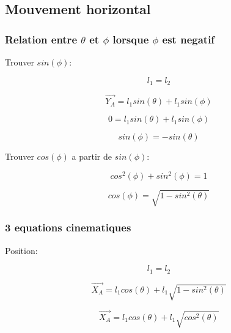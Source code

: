 \documentclass{article}
\begin{document}
\subsection{Mouvement horizontal}
\subsubsection{Relation entre $\theta$ et $\phi$ lorsque $\phi$ est negatif}

Trouver $sin(\phi)$:

\begin{equation}
l_1 = l_2
\end{equation}

\begin{equation}
\overrightarrow{Y_A} = l_1sin(\theta)+l_1sin(\phi)
\end{equation}

\begin{equation}
0 = l_1sin(\theta)+l_1sin(\phi)
\end{equation}

\begin{equation}
sin(\phi) = -sin(\theta)
\end{equation}

\newpage
\noindent Trouver $cos(\phi)$ a partir de $sin(\phi)$:

\begin{equation}
cos^2(\phi)+sin^2(\phi) = 1
\end{equation}

\begin{equation}
cos(\phi) = \sqrt{1-sin^2(\theta)}
\end{equation}

\subsubsection{3 equations cinematiques}

Position:

\begin{equation}
l_1 = l_2
\end{equation}

\begin{equation}
\overrightarrow{X_A} = l_1cos(\theta)+l_1\sqrt{1-sin^2(\theta)}
\end{equation}

\begin{equation}
\overrightarrow{X_A} = l_1cos(\theta)+l_1\sqrt{cos^2(\theta)}
\end{equation}
\end{document}
